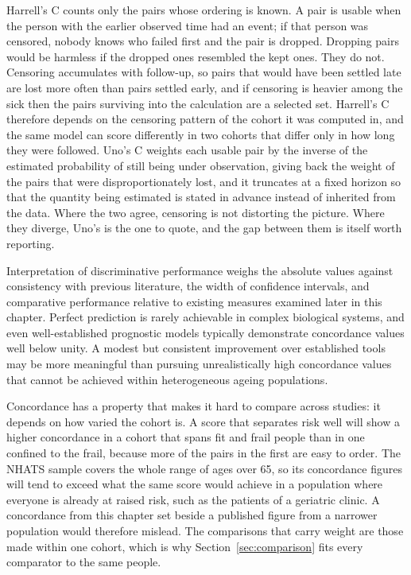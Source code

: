\begin{reading}
Harrell's C counts only the pairs whose ordering is known. A pair is usable when the person with the earlier observed time had an event; if that person was censored, nobody knows who failed first and the pair is dropped. Dropping pairs would be harmless if the dropped ones resembled the kept ones. They do not. Censoring accumulates with follow-up, so pairs that would have been settled late are lost more often than pairs settled early, and if censoring is heavier among the sick then the pairs surviving into the calculation are a selected set. Harrell's C therefore depends on the censoring pattern of the cohort it was computed in, and the same model can score differently in two cohorts that differ only in how long they were followed. Uno's C \citep{uno_2011} weights each usable pair by the inverse of the estimated probability of still being under observation, giving back the weight of the pairs that were disproportionately lost, and it truncates at a fixed horizon so that the quantity being estimated is stated in advance instead of inherited from the data. Where the two agree, censoring is not distorting the picture. Where they diverge, Uno's is the one to quote, and the gap between them is itself worth reporting.
\end{reading}

Interpretation of discriminative performance weighs the absolute values against consistency with previous literature, the width of confidence intervals, and comparative performance relative to existing measures examined later in this chapter. Perfect prediction is rarely achievable in complex biological systems, and even well-established prognostic models typically demonstrate concordance values well below unity. A modest but consistent improvement over established tools may be more meaningful than pursuing unrealistically high concordance values that cannot be achieved within heterogeneous ageing populations.

Concordance has a property that makes it hard to compare across studies: it depends on how varied the cohort is. A score that separates risk well will show a higher concordance in a cohort that spans fit and frail people than in one confined to the frail, because more of the pairs in the first are easy to order. The NHATS sample covers the whole range of ages over 65, so its concordance figures will tend to exceed what the same score would achieve in a population where everyone is already at raised risk, such as the patients of a geriatric clinic. A concordance from this chapter set beside a published figure from a narrower population would therefore mislead. The comparisons that carry weight are those made within one cohort, which is why Section~\ref{sec:comparison} fits every comparator to the same people.

